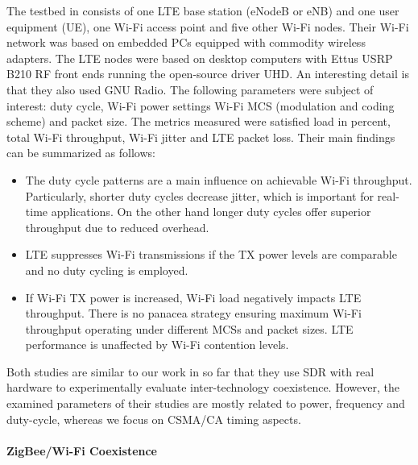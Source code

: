 The testbed in\cite{capretti16} consists of one LTE base station (eNodeB or eNB) and one user equipment (UE), one Wi-Fi access point and five other Wi-Fi nodes. Their Wi-Fi network was based on embedded PCs equipped with commodity wireless adapters. The LTE nodes were based on desktop computers with Ettus USRP B210 RF front ends running the open-source driver UHD. An interesting detail is that they also used GNU Radio. The following parameters were subject of interest: duty cycle, Wi-Fi power settings Wi-Fi MCS (modulation and coding scheme) and packet size. The metrics measured were satisfied load in percent, total Wi-Fi throughput, Wi-Fi jitter and LTE packet loss.  Their main findings can be summarized as follows: 
\begin{itemize}
	\item The duty cycle patterns are a main influence on achievable Wi-Fi throughput. Particularly, shorter duty cycles decrease jitter, which is important for real-time applications. On the other hand longer duty cycles offer superior throughput due to reduced overhead.
	\item LTE suppresses Wi-Fi transmissions if the TX power levels are comparable and no duty cycling is employed.
	\item If Wi-Fi TX power is increased, Wi-Fi load negatively impacts LTE throughput. There is no panacea strategy ensuring maximum Wi-Fi throughput operating under different MCSs and packet sizes. LTE performance is unaffected by Wi-Fi contention levels.
\end{itemize}

Both studies are similar to our work in so far that they use SDR with real hardware to experimentally evaluate inter-technology coexistence. However, the examined parameters of their studies are mostly related to power, frequency and duty-cycle, whereas we focus on CSMA/CA timing aspects.

\paragraph{ZigBee/Wi-Fi Coexistence}

